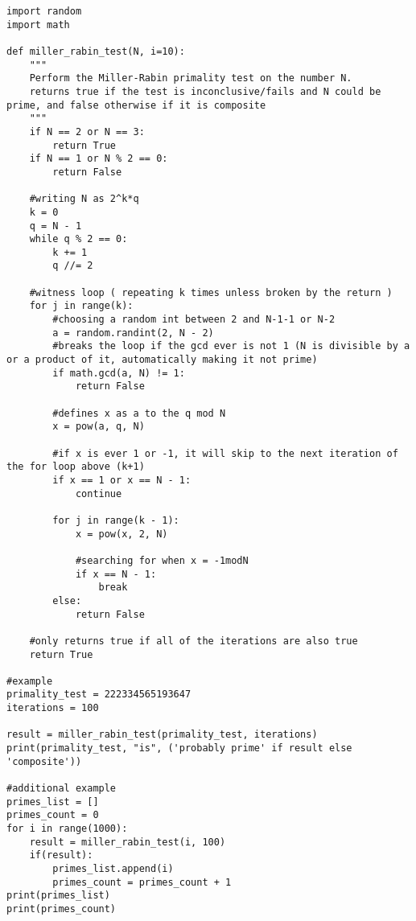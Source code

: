 \documentclass[11pt,a4paper]{article}
\begin{document}
\begin{lstlisting}
import random
import math

def miller_rabin_test(N, i=10):
    """
    Perform the Miller-Rabin primality test on the number N.
    returns true if the test is inconclusive/fails and N could be prime, and false otherwise if it is composite
    """
    if N == 2 or N == 3:
        return True
    if N == 1 or N % 2 == 0:
        return False

    #writing N as 2^k*q
    k = 0
    q = N - 1
    while q % 2 == 0:
        k += 1
        q //= 2
        
    #witness loop ( repeating k times unless broken by the return )
    for j in range(k):
        #choosing a random int between 2 and N-1-1 or N-2
        a = random.randint(2, N - 2)
        #breaks the loop if the gcd ever is not 1 (N is divisible by a or a product of it, automatically making it not prime)
        if math.gcd(a, N) != 1:
            return False

        #defines x as a to the q mod N
        x = pow(a, q, N)

        #if x is ever 1 or -1, it will skip to the next iteration of the for loop above (k+1)
        if x == 1 or x == N - 1:
            continue

        for j in range(k - 1):
            x = pow(x, 2, N)

            #searching for when x = -1modN
            if x == N - 1:
                break
        else:
            return False
    
    #only returns true if all of the iterations are also true
    return True

#example
primality_test = 222334565193647  
iterations = 100       

result = miller_rabin_test(primality_test, iterations)
print(primality_test, "is", ('probably prime' if result else 'composite'))

#additional example
primes_list = []
primes_count = 0
for i in range(1000):
    result = miller_rabin_test(i, 100)
    if(result):
        primes_list.append(i)
        primes_count = primes_count + 1
print(primes_list)
print(primes_count)
\end{lstlisting}
\end{document}
